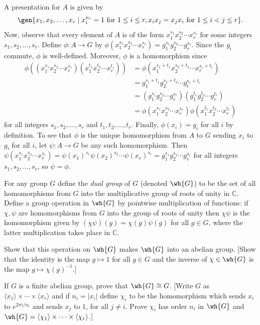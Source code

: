 \begin{sol}
    A presentation for $A$ is given by
    \[\gen{x_1, x_2, \ldots, x_r \mid x_i^{n_i} = 1 \text{ for } 1 \leq i \leq r, x_ix_j = x_jx_i \text{ for } 1 \leq i < j \leq r}.\]
    Now, observe that every element of $A$ is of the form $x_1^{s_1} x_2^{s_2} \cdots x_r^{s_r}$ for some integers $s_1, s_2, \ldots, s_r$. Define $\phi : A \to G$ by $\phi(x_1^{s_1} x_2^{s_2} \cdots x_r^{s_r}) = g_1^{s_1} g_2^{s_2} \cdots g_r^{s_r}$. Since the $g_i$ commute, $\phi$ is well-defined. Moreover, $\phi$ is a homomorphism since
    \begin{align*}
        \phi((x_1^{s_1} x_2^{s_2} \cdots x_r^{s_r})(x_1^{t_1} x_2^{t_2} \cdots x_r^{t_r})) & = \phi(x_1^{s_1 + t_1} x_2^{s_2 + t_2} \cdots x_r^{s_r + t_r}) \\
        & = g_1^{s_1 + t_1} g_2^{s_2 + t_2} \cdots g_r^{s_r + t_r} \\
        & = (g_1^{s_1} g_2^{s_2} \cdots g_r^{s_r})(g_1^{t_1} g_2^{t_2} \cdots g_r^{t_r}) \\
        & = \phi(x_1^{s_1} x_2^{s_2} \cdots x_r^{s_r})\phi(x_1^{t_1} x_2^{t_2} \cdots x_r^{t_r})
    \end{align*}
    for all integers $s_1, s_2, \ldots, s_r$ and $t_1, t_2, \ldots, t_r$. Finally, $\phi(x_i) = g_i$ for all $i$ by definition. To see that $\phi$ is the unique homomorphism from $A$ to $G$ sending $x_i$ to $g_i$ for all $i$, let $\psi : A \to G$ be any such homomorphism. Then $\psi(x_1^{s_1} x_2^{s_2} \cdots x_r^{s_r}) = \psi(x_1)^{s_1} \psi(x_2)^{s_2} \cdots \psi(x_r)^{s_r} = g_1^{s_1} g_2^{s_2} \cdots g_r^{s_r}$ for all integers $s_1, s_2, \ldots, s_r$, so $\psi = \phi$.
\end{sol}

\begin{specialexercise}\label{ex5.2.14}
    For any group $G$ define the \textit{dual group} of $G$ (denoted $\wh{G}$) to be the set of all homomorphisms from $G$ into the multiplicative group of roots of unity in $\mathbb{C}$. Define a group operation in $\wh{G}$ by pointwise multiplication of functions: if $\chi, \psi$ are homomorphisms from $G$ into the group of roots of unity then $\chi\psi$ is the homomorphism given by $(\chi\psi)(g) = \chi(g)\psi(g)$ for all $g \in G$, where the latter multiplication takes place in $\mathbb{C}$.
    \begin{subproblems}
        \item Show that this operation on $\wh{G}$ makes $\wh{G}$ into an abelian group. [Show that the identity is the map $g \mapsto 1$ for all $g \in G$ and the inverse of $\chi \in \wh{G}$ is the map $g \mapsto \chi(g)^{-1}$.]
        \item If $G$ is a finite abelian group, prove that $\wh{G} \cong G$. [Write $G$ as $\langle x_1 \rangle \times \cdots \times \langle x_r \rangle$ and if $n_i = |x_i|$ define $\chi_i$ to be the homomorphism which sends $x_i$ to $e^{2\pi i/n_i}$ and sends $x_j$ to $1$, for all $j \neq i$. Prove $\chi_i$ has order $n_i$ in $\wh{G}$ and $\wh{G} = \langle \chi_1 \rangle \times \cdots \times \langle \chi_r \rangle$.]
    \end{subproblems}
\end{specialexercise}

